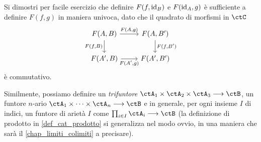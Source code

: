 Si dimostri per facile esercizio che definire \(F(f,\mathrm{id}_B)\) e \(F(\mathrm{id}_A,g)\) è sufficiente a definire \(F(f,g)\) in maniera univoca, dato che il quadrato di morfismi in \(\ctC\)
\[
	\begin{tikzcd}
		F(A,B) \ar[r, "{F(A,g)}"]\ar[d, "{F(f,B)}"'] & F(A,B') \ar[d, "{F(f,B')}"]\\
		F(A',B) \ar[r, "{F(A',g)}"'] & F(A',B')
	\end{tikzcd}
\]
è commutativo.
\begin{notation}
	Similmente, possiamo definire un \emph{trifuntore} \(\ctA_1\times\ctA_2\times\ctA_3\fun\ctB\), un funtore \(n\)-ario \(\ctA_1\times\dots\times\ctA_n\fun\ctB\) e in generale, per ogni insieme \(I\) di indici, un funtore di arietà \(I\) come \(\prod_{i\in I}\ctA_i\fun\ctB\) (la definizione di prodotto in \ref{def_cat_prodotto} si generalizza nel modo ovvio, in una maniera che sarà il \autoref{chap_limiti_colimiti} a precisare).
\end{notation}
